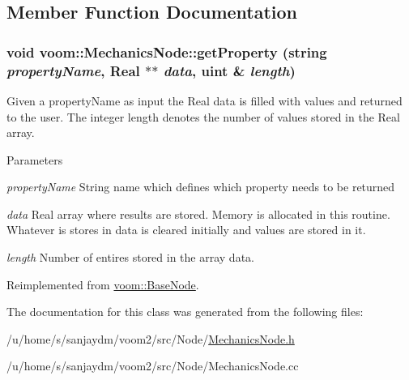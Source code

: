 \subsection{Member Function Documentation}
\hypertarget{classvoom_1_1_mechanics_node_a921fd1f238a85727c87f1f2833d222ab}{
\subsubsection[{getProperty}]{\setlength{\rightskip}{0pt plus 5cm}void voom::MechanicsNode::getProperty (string {\em propertyName}, \/  Real $\ast$$\ast$ {\em data}, \/  uint \& {\em length})}}
\label{classvoom_1_1_mechanics_node_a921fd1f238a85727c87f1f2833d222ab}
Given a propertyName as input the Real data is filled with values and returned to the user. The integer length denotes the number of values stored in the Real array. 
\begin{DoxyParams}{Parameters}
\item[{\em propertyName}]String name which defines which property needs to be returned \item[{\em data}]Real array where results are stored. Memory is allocated in this routine. Whatever is stores in data is cleared initially and values are stored in it. \item[{\em length}]Number of entires stored in the array data. \end{DoxyParams}


Reimplemented from \hyperlink{classvoom_1_1_base_node_a4d42efec19c4e3f4770828688daa65c5}{voom::BaseNode}.

The documentation for this class was generated from the following files:\begin{DoxyCompactItemize}
\item 
/u/home/s/sanjaydm/voom2/src/Node/\hyperlink{_mechanics_node_8h}{MechanicsNode.h}\item 
/u/home/s/sanjaydm/voom2/src/Node/MechanicsNode.cc\end{DoxyCompactItemize}
